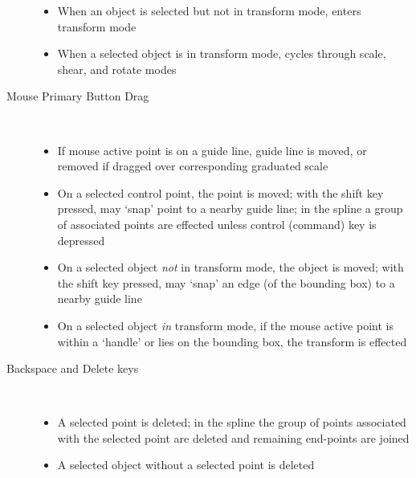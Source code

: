 \begin{description}
		    \begin{itemize}
		      \item When an object is selected but not in
		        transform mode, enters transform mode
		      \item When a selected object is in transform mode,
		        cycles through scale, shear, and rotate modes
		    \end{itemize}
		  \item[Mouse Primary Button Drag] \hfill \\
		    \begin{itemize}
		      \item If mouse active point is on a guide line,
		        guide line is moved, or removed if dragged over
		        corresponding graduated scale
		      \item On a selected control point, the point
		        is moved; with the shift key pressed,
		        may `snap' point to a nearby guide line;
		        in the \dtybeznl{} spline a group of associated
		        points are effected unless control (command)
		        key is depressed
		      \item On a selected object \emph{not}
		        in transform mode,
		        the object is moved; with the shift key
		        pressed, may `snap' an edge (of the bounding
		        box) to a nearby guide line
		      \item On a selected object \emph{in} transform mode,
		        if the mouse active point is within a `handle'
		        or lies on the bounding box, the
		        transform is effected
		    \end{itemize}
		  \item[Backspace and Delete keys] \hfill \\
		    \begin{itemize}
		      \item A selected point is deleted;
		        in the \dtybeznl{} spline the group of
		        points associated with the selected point
		        are deleted and remaining end-points are joined
		      \item A selected object
		        without a selected point is deleted
		    \end{itemize}
		\end{description}

















